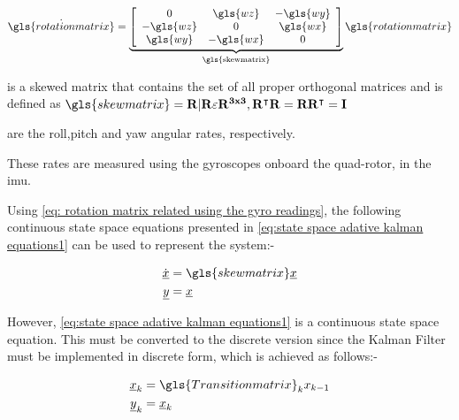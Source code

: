\begin{equation}
\dot{\gls{rotationmatrix}} =  \underbrace{\left[\begin{array}{ccc} 0 & \gls{wz} & -\gls{wy}\\ -\gls{wz} & 0 & \gls{wx}\\ \gls{wy}&-\gls{wx} & 0 \end{array}\right] }_{\text{\gls{skewmatrix}}}\gls{rotationmatrix}  \label{eq: rotation matrix related using the gyro readings}
\end{equation} 




\begin{description}[itemsep=0.5mm]
	\item[{\bf Where:-}]
	\item[\gls{skewmatrix}:] is a skewed matrix that contains the set of all proper orthogonal matrices and is defined as {$\gls{skewmatrix} \bf= R|R\varepsilon R^{3x3},R^\intercal R = RR^\intercal = I$}
	\item[\gls{wx}, \gls{wy}, \gls{wz}:] are the roll,pitch and yaw angular rates, respectively.
\end{description}

These rates are measured using the gyroscopes onboard the quad-rotor, in the \gls{imu}.

Using \eqref{eq: rotation matrix related using the gyro readings}, the following continuous state space equations presented in \eqref{eq:state space adative kalman equations1} can be used to  represent the system:-
 


\begin{align}
\begin{split}
\dot{\underline{x}} &= \gls{skewmatrix}\underline{x}\\
\underline{y}              &= \underline{x}
\end{split}
\label{eq:state space adative kalman equations1}
\end{align}

However, \eqref{eq:state space adative kalman equations1} is a continuous state space equation. This must be converted to the discrete version since the Kalman Filter must be implemented in discrete form, which is achieved as follows:-

\begin{align}
\begin{split}
\underline{x}_k &= \gls{Transitionmatrix}_k x_{k-1}\\
\underline{y}_k              &= \underline{x}_k
\end{split}
\end{align}



